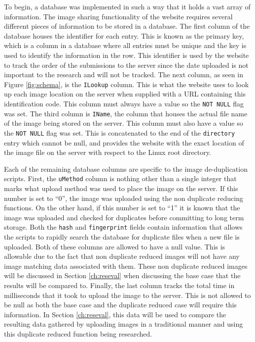 To begin, a database was implemented in such a way that it holds a vast array of information. The image sharing functionality of the website requires several different pieces of information to be stored in a database. The first column of the database houses the identifier for each entry. This is known as the primary key, which is a column in a database where all entries must be unique and the key is used to identify the information in the row. This identifier is used by the website to track the order of the submissions to the server since the date uploaded is not important to the research and will not be tracked. The next column, as seen in Figure \ref{fig:schema}, is the {\tt ILookup} column. This is what the website uses to look up each image location on the server when supplied with a URL containing this identification code. This column must always have a value so the {\tt NOT NULL} flag was set. The third column is {\tt IName}, the column that houses the actual file name of the image being stored on the server. This column must also have a value so the {\tt NOT NULL} flag was set. This is concatenated to the end of the {\tt directory} entry which cannot be null, and provides the website with the exact location of the image file on the server with respect to the Linux root directory.

Each of the remaining database columns are specific to the image de-duplication scripts. First, the {\tt uMethod} column is nothing other than a single integer that marks what upload method was used to place the image on the server. If this number is set to ``0'', the image was uploaded using the non duplicate reducing functions. On the other hand, if this number is set to ``1'' it is known that the image was uploaded and checked for duplicates before committing to long term storage. Both the {\tt hash} and {\tt fingerprint} fields contain information that allows the scripts to rapidly search the database for duplicate files when a new file is uploaded.  Both of these columns are allowed to have a null value. This is allowable due to the fact that non duplicate reduced images will not have any image matching data associated with them. These non duplicate reduced images will be discussed in Section \ref{ch:reseval} when discussing the base case that the results will be compared to. Finally, the last column tracks the total time in milliseconds that it took to upload the image to the server. This is not allowed to be null as both the base case and the duplicate reduced case will require this information. In Section \ref{ch:reseval}, this data will be used to compare the resulting data gathered by uploading images in a traditional manner and using this duplicate reduced function being researched.

